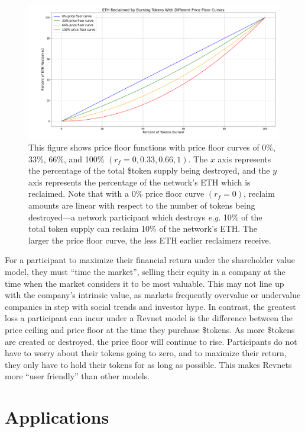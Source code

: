 \documentclass{article}
\begin{document}
\begin{figure}[ht]
  \centering
  \includegraphics[width=\textwidth]{figures/multi-floor-curves.png}
  \caption{This figure shows price floor functions with price floor curves of 0\%, 33\%, 66\%, and 100\% $(r_f = 0, 0.33, 0.66, 1)$. The $x$ axis represents the percentage of the total \$token supply being destroyed, and the $y$ axis represents the percentage of the network's ETH which is reclaimed. Note that with a 0\% price floor curve $(r_f = 0)$, reclaim amounts are linear with respect to the number of tokens being destroyed---a network participant which destroys \textit{e.g.} 10\% of the total token supply can reclaim 10\% of the network's ETH. The larger the price floor curve, the less ETH earlier reclaimers receive.}
\end{figure}

For a participant to maximize their financial return under the shareholder value model, they must ``time the market'', selling their equity in a company at the time when the market considers it to be most valuable. This may not line up with the company's intrinsic value, as markets frequently overvalue or undervalue companies in step with social trends and investor hype. In contrast, the greatest loss a participant can incur under a Revnet model is the difference between the price ceiling and price floor at the time they purchase \$tokens. As more \$tokens are created or destroyed, the price floor will continue to rise. Participants do not have to worry about their tokens going to zero, and to maximize their return, they only have to hold their tokens for as long as possible. This makes Revnets more ``user friendly'' than other models.

\section{Applications}
\end{document}
